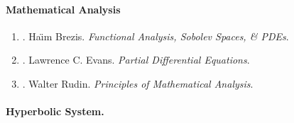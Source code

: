 \documentclass{article}
\begin{document}
\paragraph{Mathematical Analysis}

\begin{enumerate}
	\item \cite{Brezis2011}. Ha\"\i m Brezis. {\it Functional Analysis, Sobolev Spaces, \& PDEs}.\hfill{\sf[reading]}
	
	\item \cite{Evans2010}. Lawrence C. Evans. {\it Partial Differential Equations}.\hfill{\sf[reading]}
	
	\item \cite{Rudin1976}. Walter Rudin. {\it Principles of Mathematical Analysis}.\hfill{\sf[done]}
\end{enumerate}

\paragraph{Hyperbolic System.}
\end{document}
